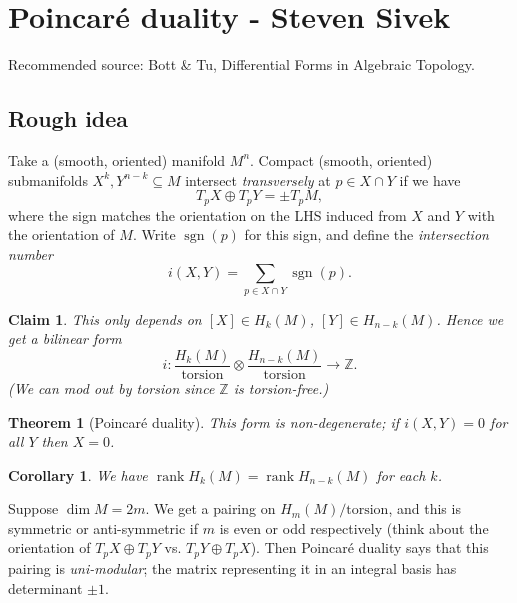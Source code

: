\documentclass{article}
\newtheorem*{theorem}{Theorem}
\newtheorem*{corollary}{Corollary}
\newtheorem*{claim}{Claim}
\theoremstyle{definition}
\DeclareMathOperator{\sgn}{sgn}
\DeclareMathOperator{\rank}{rank}
\newcommand{\Z}{\mathbb{Z}}
\begin{document}
\newpage

\section{Poincar\'e duality - Steven Sivek}

Recommended source: Bott \& Tu, Differential Forms in Algebraic Topology.

\subsection*{Rough idea}

Take a (smooth, oriented) manifold $M^n$. Compact (smooth, oriented) submanifolds
$X^k,Y^{n-k}\subseteq M$ intersect \emph{transversely} at $p\in X\cap Y$ if we
have
\begin{equation*}
    T_pX\oplus T_pY = \pm T_pM,
\end{equation*}
where the sign matches the orientation on the LHS induced from $X$ and $Y$ with
the orientation of $M$. Write $\sgn(p)$ for this sign, and define the
\emph{intersection number}
\begin{equation*}
    i(X,Y) = \sum_{p\in X\cap Y}\sgn(p).
\end{equation*}

\begin{claim}
    This only depends on $[X]\in H_k(M)$, $[Y]\in H_{n-k}(M)$. Hence we get a
    bilinear form
    \begin{equation*}
        i:\frac{H_k(M)}{\text{torsion}}
            \otimes\frac{H_{n-k}(M)}{\text{torsion}}\to\Z.
    \end{equation*}
    (We can mod out by torsion since $\Z$ is torsion-free.)
\end{claim}

\begin{theorem}[Poincar\'e duality]
    This form is non-degenerate; if $i(X,Y)=0$ for all $Y$ then $X=0$.
\end{theorem}

\begin{corollary}
    We have $\rank H_k(M)=\rank H_{n-k}(M)$ for each $k$.
\end{corollary}

Suppose $\dim M=2m$. We get a pairing on $H_m(M)/\text{torsion}$, and this is
symmetric or anti-symmetric if $m$ is even or odd respectively (think about the
orientation of $T_pX\oplus T_pY$ vs. $T_pY\oplus T_pX$). Then Poincar\'e duality
says that this pairing is \emph{uni-modular}; the matrix representing it in an
integral basis has determinant $\pm1$.
\end{document}
